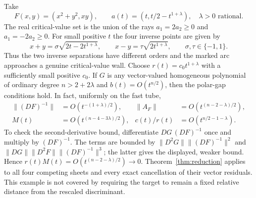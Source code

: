\begin{example}\label{ex:collision}
Take
\[
 F(x,y)=(x^2+y^2,xy),\qquad
 a(t)=(t,t/2-t^{1+\lambda}),\quad \lambda>0\text{ rational}.
\]
The real critical-value set is the union of the rays $a_1=2a_2\ge0$ and $a_1=-2a_2\ge0$. For small positive $t$ the four inverse points are given by
\[
 x+y=\sigma\sqrt{2t-2t^{1+\lambda}},\qquad
 x-y=\tau\sqrt{2t^{1+\lambda}},\qquad \sigma,\tau\in\{-1,1\}.
\]
Thus the two inverse separations have different orders and the marked arc approaches a genuine critical-value wall. Choose $r(t)=c_0t^{1+\lambda}$ with a sufficiently small positive $c_0$. If $G$ is any vector-valued homogeneous polynomial of ordinary degree $n>2+2\lambda$ and $b(t)=O(t^{n/2})$, then the polar-gap conditions hold. In fact, uniformly on the fast tube,
\begin{align*}
 \|(DF)^{-1}\|&=O(t^{-(1+\lambda)/2}),&
 \|A_F\|&=O(t^{(n-2-\lambda)/2}),\\
 M(t)&=O(t^{(n-4-3\lambda)/2}),&
 c(t)/r(t)&=O(t^{n/2-1-\lambda}).
\end{align*}
To check the second-derivative bound, differentiate $DG\,(DF)^{-1}$ once and multiply by $(DF)^{-1}$. The terms are bounded by
$\|D^2G\|\|(DF)^{-1}\|^2$ and
$\|DG\|\|D^2F\|\|(DF)^{-1}\|^3$; the latter gives the displayed, weaker bound. Hence $r(t)M(t)=O(t^{(n-2-\lambda)/2})\to0$. Theorem~\ref{thm:reduction} applies to all four competing sheets and every exact cancellation of their vector residuals. This example is not covered by requiring the target to remain a fixed relative distance from the rescaled discriminant.
\end{example}

